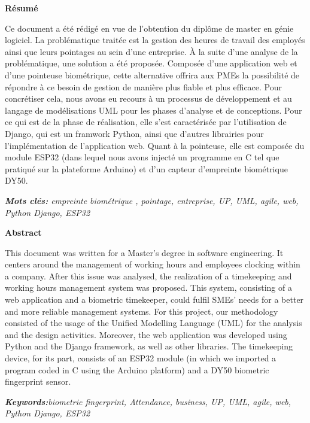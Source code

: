 \renewcommand{\headrulewidth}{0pt}
\fancyhead[R]{}

\begin{titlepage}
\newpage
\pagestyle{fancy}      
\lhead{}  
\chead{}     
\rhead{}     

\renewcommand{\headrulewidth}{0.5pt}

\begin{center}\huge{\textbf{Résumé}} \\ \end{center} 

Ce document a été rédigé en vue de l’obtention du diplôme de master en génie
logiciel. La problématique traitée est la gestion des heures de travail des
employés ainsi que leurs pointages au sein d’une entreprise. À la suite
d’une analyse de la problématique, une solution a été proposée. Composée
d’une application web et d’une pointeuse biométrique, cette alternative
offrira aux PMEs la possibilité de répondre à ce besoin de gestion de
manière plus fiable et plus efficace. Pour concrétiser cela, nous avons eu
recours à un processus de développement et au langage de modélisations UML
pour les phases d’analyse et de conceptions. Pour ce qui est de la phase de
réalisation, elle s’est caractérisée par l’utilisation de Django, qui est un
framwork Python, ainsi que d’autres librairies pour l’implémentation de
l’application web. Quant à la pointeuse, elle est composée du module ESP32
(dans lequel nous avons injecté un programme en C tel que pratiqué sur la
plateforme Arduino) et d’un capteur d’empreinte biométrique DY50.  

\emph{\textbf{Mots clés:} empreinte biométrique , pointage, entreprise, UP, UML, 
    agile, web, Python Django, ESP32}

\vspace{-20pt}
\begin{center}\huge{\textbf{Abstract}} \\ \end{center}

This document was written for a Master’s degree in software engineering. It
centers around the management of working hours and employees clocking within
a company. After this issue was analysed, the realization of a timekeeping
and working hours management system was proposed. This system, consisting of
a web application and a biometric timekeeper, could fulfil SMEs’ needs for a
better and more reliable management systems. For this project, our methodology
consisted of the usage of the Unified Modelling Language (UML) for the analysis
and the design activities. Moreover, the web application was developed using
Python and the Django framework, as well as other libraries. The timekeeping
device, for its part, consists of an ESP32 module (in which we imported a
program coded in C using the Arduino platform) and a DY50 biometric
fingerprint sensor. 

\emph{\textbf{Keywords:}biometric fingerprint, Attendance, business, UP, UML, 
    agile, web, Python Django, ESP32}

\end{titlepage}
